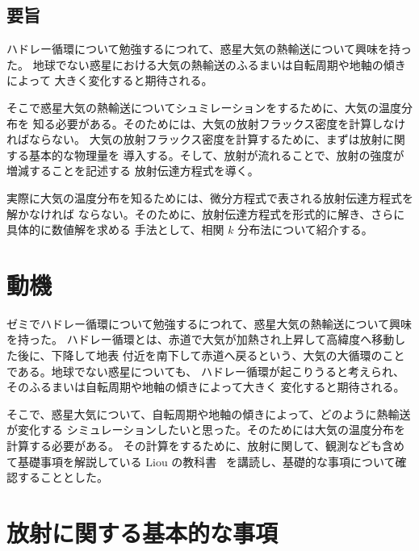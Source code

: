 \documentclass[book]{dennou777}
\renewcommand{\maketitle}{\epmaketitle}
\begin{document}
\begin{titlepage}
	\maketitle
\end{titlepage}

\cleardoublepage

\rule{0pt}{0pt}\vfill
\section*{要旨}
ハドレー循環について勉強するにつれて、惑星大気の熱輸送について興味を持った。
地球でない惑星における大気の熱輸送のふるまいは自転周期や地軸の傾きによって
大きく変化すると期待される。

そこで惑星大気の熱輸送についてシュミレーションをするために、大気の温度分布を
知る必要がある。そのためには、大気の放射フラックス密度を計算しなければならない。
大気の放射フラックス密度を計算するために、まずは放射に関する基本的な物理量を
導入する。そして、放射が流れることで、放射の強度が増減することを記述する
放射伝達方程式を導く。

実際に大気の温度分布を知るためには、微分方程式で表される放射伝達方程式を解かなければ
ならない。そのために、放射伝達方程式を形式的に解き、さらに具体的に数値解を求める
手法として、相関 $k$ 分布法について紹介する。
\vfill\rule{0pt}{0pt}

\pagebreak

\tableofcontents
\pagebreak

\chapter{動機}

ゼミでハドレー循環について勉強するにつれて、惑星大気の熱輸送について興味を持った。
ハドレー循環とは、赤道で大気が加熱され上昇して高緯度へ移動した後に、下降して地表
付近を南下して赤道へ戻るという、大気の大循環のことである。地球でない惑星についても、
ハドレー循環が起こりうると考えられ、そのふるまいは自転周期や地軸の傾きによって大きく
変化すると期待される。

そこで、惑星大気について、自転周期や地軸の傾きによって、どのように熱輸送が変化する
シミュレーションしたいと思った。そのためには大気の温度分布を計算する必要がある。
その計算をするために、放射に関して、観測なども含めて基礎事項を解説している Liou
の教科書~\cite{liou} を講読し、基礎的な事項について確認することとした。

\chapter{放射に関する基本的な事項}
\end{document}
